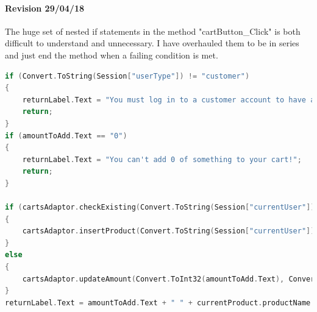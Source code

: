 ﻿\documentclass{article}
\begin{document}
    \paragraph{Revision 29/04/18}
    The huge set of nested if statements in the method "cartButton\_Click" is both difficult to understand and unnecessary.
    I have overhauled them to be in series and just end the method when a failing condition is met.
    \begin{lstlisting}[language=C]
if (Convert.ToString(Session["userType"]) != "customer")
{
    returnLabel.Text = "You must log in to a customer account to have a cart!";
    return;
}
if (amountToAdd.Text == "0")
{
    returnLabel.Text = "You can't add 0 of something to your cart!";
    return;
}

if (cartsAdaptor.checkExisting(Convert.ToString(Session["currentUser"]), currentProduct.productName) == null)
{
    cartsAdaptor.insertProduct(Convert.ToString(Session["currentUser"]), currentProduct.productName, Convert.ToInt32(amountToAdd.Text));
}
else
{
    cartsAdaptor.updateAmount(Convert.ToInt32(amountToAdd.Text), Convert.ToString(Session["currentUser"]), currentProduct.productName);
}
returnLabel.Text = amountToAdd.Text + " " + currentProduct.productName + "s added to your cart!";
    \end{lstlisting}
    \newpage
\end{document}
